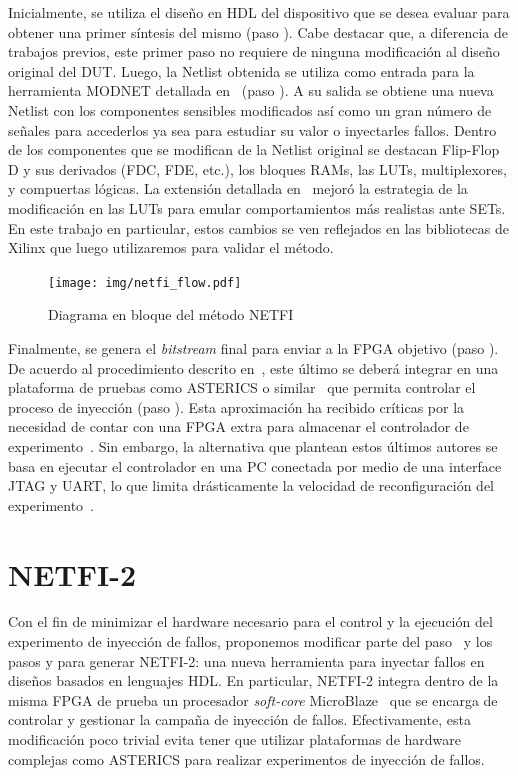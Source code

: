 \documentclass[a4paper,openright,12pt]{report}
\newcommand*\circled[1]{\tikz[baseline=(char.base)]{
            \node[shape=circle,draw,inner sep=0.7pt] (char) {#1};}}
\begin{document}
Inicialmente, se utiliza el diseño en HDL del dispositivo que se desea evaluar para obtener una primer síntesis del mismo (paso \circled{1}). Cabe destacar que, a diferencia de trabajos previos, este primer paso no requiere de ninguna modificación al diseño original del DUT. Luego, la Netlist obtenida se utiliza como entrada para la herramienta MODNET detallada en~\cite{Mansour2013-1} (paso \circled{2}). A su salida se obtiene una nueva Netlist con los componentes sensibles modificados así como un gran número de señales para accederlos ya sea para estudiar su valor o inyectarles fallos. Dentro de los componentes que se modifican de la Netlist original se destacan Flip-Flop D  y sus derivados (FDC, FDE, etc.), los bloques RAMs, las LUTs, multiplexores, y compuertas lógicas. La extensión detallada en~\cite{Mansour2013-2} mejoró la estrategia de la modificación en las LUTs para emular comportamientos más realistas ante SETs. En este trabajo en particular, estos cambios se ven reflejados en las bibliotecas de Xilinx que luego utilizaremos para validar el método.

\begin{figure}[H]
	\centering
	\texttt{[image: img/netfi\_flow.pdf]}
	\caption{Diagrama en bloque del método NETFI}
	\label{netfi_flow}
\end{figure}

Finalmente, se genera el \emph{bitstream} final para enviar a la FPGA objetivo (paso \circled{3}). De acuerdo al procedimiento descrito en~\cite{Mansour2013-2}, este último se deberá integrar en una plataforma de pruebas como ASTERICS o similar~\cite{Velazco2001} que permita controlar el proceso de inyección (paso \circled{4}). Esta aproximación ha recibido críticas por la necesidad de contar con una FPGA extra para almacenar el controlador de experimento~\cite{Serrano2015}. Sin embargo, la alternativa que plantean estos últimos autores se basa en ejecutar el controlador en una PC conectada por medio de una interface JTAG y UART, lo que limita drásticamente la velocidad de reconfiguración del experimento~\cite{Alaminos2012}.

\section{ NETFI-2}
\label{DescripcionNetfi2}Con el fin de minimizar el hardware necesario para el control y la ejecución del experimento de inyección de fallos, proponemos modificar parte del paso~\circled{2} y los pasos \circled{3} y \circled{4} para generar \mbox{NETFI-2}: una nueva herramienta para inyectar fallos en diseños basados en lenguajes HDL. En particular, NETFI-2 integra dentro de la misma FPGA de prueba un procesador \emph{soft-core} MicroBlaze~\cite{uBlaze} que se encarga de controlar y gestionar la campaña de inyección de fallos. Efectivamente, esta modificación poco trivial evita tener que utilizar plataformas de hardware complejas como ASTERICS para realizar experimentos de inyección de fallos. 
\end{document}
